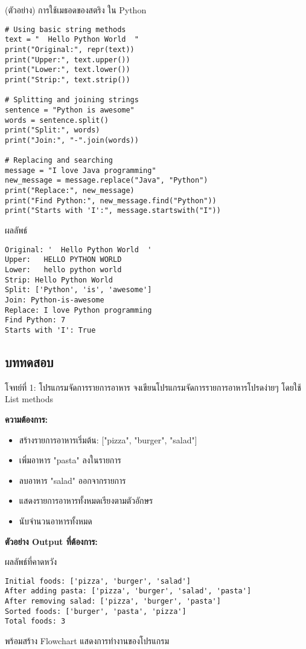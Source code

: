 \documentclass[12pt,a4paper]{article}
\newcommand{\textlight}[1]{{\thailightfont #1}}
\begin{document}
\begin{codebox}{(ตัวอย่าง) การใช้เมธอดของสตริง ใน Python}
\begin{lstlisting}[style=python]
# Using basic string methods
text = "  Hello Python World  "
print("Original:", repr(text))
print("Upper:", text.upper())
print("Lower:", text.lower())
print("Strip:", text.strip())

# Splitting and joining strings
sentence = "Python is awesome"
words = sentence.split()
print("Split:", words)
print("Join:", "-".join(words))

# Replacing and searching
message = "I love Java programming"
new_message = message.replace("Java", "Python")
print("Replace:", new_message)
print("Find Python:", new_message.find("Python"))
print("Starts with 'I':", message.startswith("I"))
\end{lstlisting}
\end{codebox}

\begin{resultbox}{ผลลัพธ์}
\begin{verbatim}
Original: '  Hello Python World  '
Upper:   HELLO PYTHON WORLD  
Lower:   hello python world  
Strip: Hello Python World
Split: ['Python', 'is', 'awesome']
Join: Python-is-awesome
Replace: I love Python programming
Find Python: 7
Starts with 'I': True
\end{verbatim}
\end{resultbox}

\subsection{บททดสอบ}

\begin{exercisebox}{โจทย์ที่ 1: โปรแกรมจัดการรายการอาหาร}
\textlight{จงเขียนโปรแกรมจัดการรายการอาหารโปรดง่ายๆ โดยใช้ List methods}

\textlight{\textbf{ความต้องการ:}}
\begin{itemize}
    \item \textlight{สร้างรายการอาหารเริ่มต้น: ["pizza", "burger", "salad"]}
    \item \textlight{เพิ่มอาหาร "pasta" ลงในรายการ}
    \item \textlight{ลบอาหาร "salad" ออกจากรายการ}
    \item \textlight{แสดงรายการอาหารทั้งหมดเรียงตามตัวอักษร}
    \item \textlight{นับจำนวนอาหารทั้งหมด}
\end{itemize}

\textlight{\textbf{ตัวอย่าง Output ที่ต้องการ:}}
\begin{codebox}{ผลลัพธ์ที่คาดหวัง}
\begin{lstlisting}[style=python]
Initial foods: ['pizza', 'burger', 'salad']
After adding pasta: ['pizza', 'burger', 'salad', 'pasta']
After removing salad: ['pizza', 'burger', 'pasta']
Sorted foods: ['burger', 'pasta', 'pizza']
Total foods: 3
\end{lstlisting}
\end{codebox}
\textlight{พร้อมสร้าง Flowchart แสดงการทำงานของโปรแกรม}
\end{exercisebox}
\end{document}
